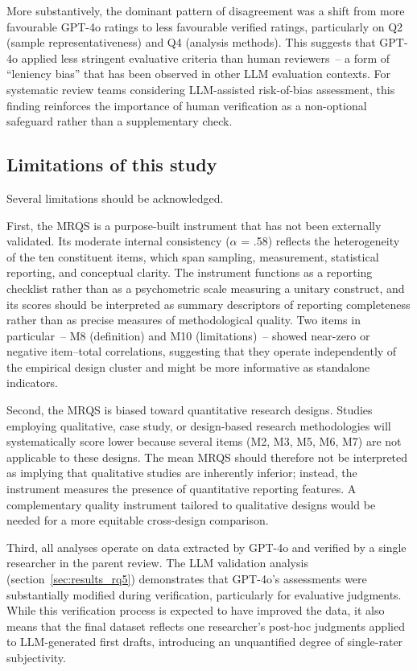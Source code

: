 \documentclass[etq]{acnsart}
\begin{document}
	More substantively, the dominant pattern of disagreement was a shift from more favourable GPT-4o ratings to less favourable verified ratings, particularly on Q2 (sample representativeness) and Q4 (analysis methods). This suggests that GPT-4o applied less stringent evaluative criteria than human reviewers~-- a form of ``leniency bias'' that has been observed in other LLM evaluation contexts. For systematic review teams considering LLM-assisted risk-of-bias assessment, this finding reinforces the importance of human verification as a non-optional safeguard rather than a supplementary check.
	
	\subsection{Limitations of this study}
	\label{sec:discussion_limitations}
	
	Several limitations should be acknowledged.
	
	First, the MRQS is a purpose-built instrument that has not been externally validated. Its moderate internal consistency ($\alpha$ = .58) reflects the heterogeneity of the ten constituent items, which span sampling, measurement, statistical reporting, and conceptual clarity. The instrument functions as a reporting checklist rather than as a psychometric scale measuring a unitary construct, and its scores should be interpreted as summary descriptors of reporting completeness rather than as precise measures of methodological quality. Two items in particular~-- M8 (definition) and M10 (limitations)~-- showed near-zero or negative item--total correlations, suggesting that they operate independently of the empirical design cluster and might be more informative as standalone indicators.
	
	Second, the MRQS is biased toward quantitative research designs. Studies employing qualitative, case study, or design-based research methodologies will systematically score lower because several items (M2, M3, M5, M6, M7) are not applicable to these designs. The mean MRQS should therefore not be interpreted as implying that qualitative studies are inherently inferior; instead, the instrument measures the presence of quantitative reporting features. A complementary quality instrument tailored to qualitative designs would be needed for a more equitable cross-design comparison.
	
	Third, all analyses operate on data extracted by GPT-4o and verified by a single researcher in the parent review. The LLM validation analysis (section~\ref{sec:results_rq5}) demonstrates that GPT-4o's assessments were substantially modified during verification, particularly for evaluative judgments. While this verification process is expected to have improved the data, it also means that the final dataset reflects one researcher's post-hoc judgments applied to LLM-generated first drafts, introducing an unquantified degree of single-rater subjectivity.
	
\end{document}
